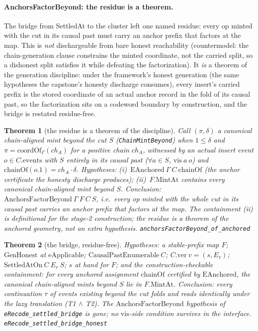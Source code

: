 \documentclass[11pt]{article}
\newtheorem{theorem}{Theorem}[section]
\newcommand{\lean}[1]{\texttt{#1}}
\begin{document}
\paragraph{AnchorsFactorBeyond: the residue is a theorem.} The bridge
from SettledAt to the cluster left one named residue: every op minted
with the cut in its causal past must carry an anchor prefix that
factors at the map. This is \emph{not} dischargeable from bare honest
reachability (countermodel: the chain-generation clause constrains the
minted coordinate, not the carried split, so a dishonest split
satisfies it while defeating the factorization). It \emph{is} a theorem
of the generation discipline: under the framework's honest generation
(the same hypotheses the capstone's honesty discharge consumes), every
insert's carried prefix is the stored coordinate of an actual anchor
record in the fold of its causal past, so the factorization sits on a
codeword boundary by construction, and the bridge is restated
residue-free.

\begin{theorem}[the residue is a theorem of the discipline]
\label{thm:anchorsfactor}
Call $(\pi, \delta)$ a \emph{canonical chain-aligned mint beyond the
cut} $S$ (\lean{ChainMintBeyond}) when $1 \le \delta$ and $\pi =
\mathrm{coordOf}_\Gamma(\mathit{ch}_A)$ for a positive chain
$\mathit{ch}_A$, witnessed by an actual insert event $o \in
C.\mathrm{events}$ with $S$ entirely in its causal past ($\forall a
\in S$, $\mathrm{vis}\ a\ o$) and $\mathrm{chainOf}(o.1) =
\mathit{ch}_A \cdot \delta$. Hypotheses: (i)~$\mathrm{EAnchored}\
\Gamma\ C\ \mathrm{chainOf}$ (the anchor certificate the honesty
discharge produces); (ii)~$F.\mathrm{MintAt}$ contains every canonical
chain-aligned mint beyond $S$. Conclusion:
$\mathrm{AnchorsFactorBeyond}\ \Gamma\ F\ C\ S$, i.e.\ every op minted
with the whole cut in its causal past carries an anchor prefix that
factors at the map. The containment (ii) is definitional for the
stage-2 construction; the residue is a theorem of the anchored
geometry, not an extra hypothesis.
\hfill\lean{anchorsFactorBeyond\_of\_anchored}
\end{theorem}

\begin{theorem}[the bridge, residue-free]
\label{thm:bridgehonest}
Hypotheses: a stable-prefix map $F$; $\mathrm{GenHonest}$ at
$\mathrm{eApplicable}$; $\mathrm{CausalPastEnumerable}\ C$;
$C.\mathrm{ver}\ v = (s, E_v)$; $\mathrm{SettledAtOn}\ C\ E_v\ S$;
$s$ at hand for $F$; and the construction-checkable containment: for
\emph{every} anchored assignment $\mathrm{chainOf}$ certified by
$\mathrm{EAnchored}$, the canonical chain-aligned mints beyond $S$ lie
in $F.\mathrm{MintAt}$. Conclusion: every continuation $\tau$ of
events existing beyond the cut folds and reads identically under the
lazy translation (T1 $\wedge$ T2). The $\mathrm{AnchorsFactorBeyond}$
hypothesis of \lean{eRecode\_settled\_bridge} is \emph{gone}; no
$\mathrm{vis}$-side condition survives in the interface.
\hfill\lean{eRecode\_settled\_bridge\_honest}
\end{theorem}
\end{document}
